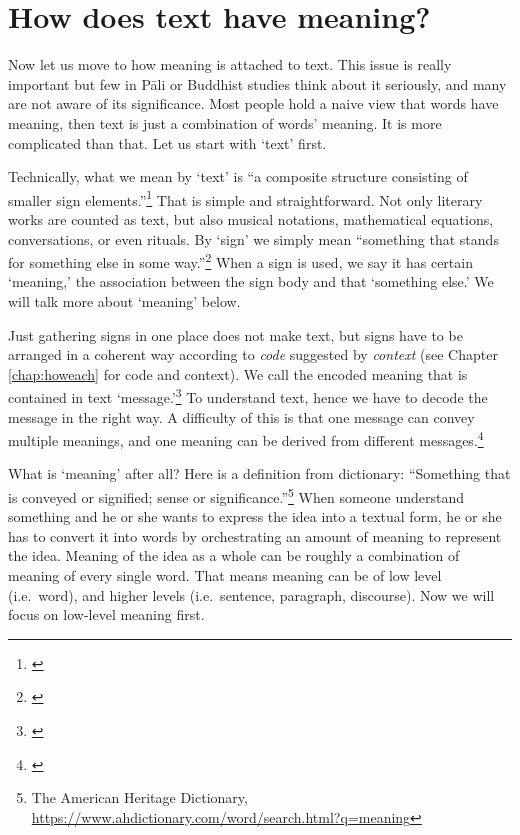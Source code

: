 \chapter{How does text have meaning?}\label{chap:howtextmean}

Now let us move to how meaning is attached to text. This issue is really important but few in P\=ali or Buddhist studies think about it seriously, and many are not aware of its significance. Most people hold a naive view that words have meaning, then text is just a combination of words' meaning. It is more complicated than that. Let us start with `text' first.

Technically, what we mean by `text' is ``a composite structure consisting of smaller sign elements.''\footnote{\citealp[p.~98]{danesi:quest}} That is simple and straightforward. Not only literary works are counted as text, but also musical notations, mathematical equations, conversations, or even rituals. By `sign' we simply mean ``something that stands for something else in some way.''\footnote{\citealp[p.~29]{danesi:quest}} When a sign is used, we say it has certain `meaning,' the association between the sign body and that `something else.' We will talk more about `meaning' below.

Just gathering signs in one place does not make text, but signs have to be arranged in a coherent way according to \emph{code} suggested by \emph{context} (see Chapter \ref{chap:howeach} for code and context). We call the encoded meaning that is contained in text `message.'\footnote{\citealp[pp.~97--8]{danesi:quest}} To understand text, hence we have to decode the message in the right way. A difficulty of this is that one message can convey multiple meanings, and one meaning can be derived from different messages.\footnote{\citealp[p.~16]{danesi:messages}}

What is `meaning' after all? Here is a definition from dictionary: ``Something that is conveyed or signified; sense or significance.''\footnote{The American Heritage Dictionary, \url{https://www.ahdictionary.com/word/search.html?q=meaning}} When someone understand something and he or she wants to express the idea into a textual form, he or she has to convert it into words by orchestrating an amount of meaning to represent the idea. Meaning of the idea as a whole can be roughly a combination of meaning of every single word. That means meaning can be of low level (i.e.\ word), and higher levels (i.e.\ sentence, paragraph, discourse). Now we will focus on low-level meaning first.

